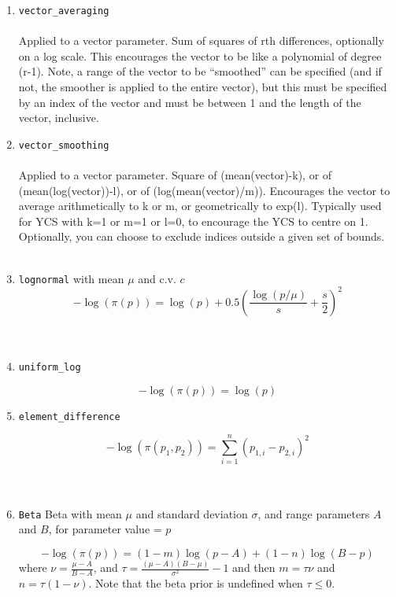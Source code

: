 \begin{enumerate}
	\item \texttt{vector\_averaging}
	\\\\
	Applied to a vector parameter. Sum of squares of rth differences, optionally on a log scale. This encourages the vector to be like a polynomial of degree (r-1). Note, a range of the vector to be “smoothed” can be specified (and if not, the smoother is applied to the entire vector), but this must be specified by an index of the vector and must be between 1 and the length of the vector, inclusive.
	\item \texttt{vector\_smoothing}
	\\\\
	Applied to a vector parameter. Square of (mean(vector)-k), or of (mean(log(vector))-l), or of (log(mean(vector)/m)). Encourages the vector to average arithmetically to k or m, or geometrically to exp(l). Typically used for YCS with k=1 or m=1 or l=0, to encourage the YCS to centre on 1. Optionally, you can choose to exclude indices outside a given set of bounds.
	\\\\
	\item\texttt{lognormal}
	 with mean $\mu$ and c.v. $c$
	\begin{equation}
	- \log \left(\pi \left(p \right) \right) = \log \left( p \right) + 0.5 \left( \frac{\log \left( p / \mu \right)}{s} + \frac{s}{2} \right)^2
	\end{equation}
	\\\\
	\item\texttt{uniform\_log}

	\begin{equation}
	- \log \left(\pi \left(p \right) \right) = \log \left( p \right)
	\end{equation}
	\item\texttt{element\_difference}

	\begin{equation}
	- \log \left(\pi \left(p_1,p_2 \right) \right) = \sum_{i = 1}^n \left( p_{1,i} - p_{2,i} \right)^2
	\end{equation}
	\\\\
	\item\texttt{Beta}
	{Beta with mean $\mu$ and standard deviation $\sigma$, and range parameters $A$ and $B$, for parameter value = $p$}

	\begin{equation}
	- \log \left(\pi \left( p \right) \right) = \left( 1 - m \right) \log \left( p - A \right) + \left( 1 - n \right)\log \left( B - p \right)
	\end{equation}
	where $\nu  = \frac{\mu  - A}{B - A}$, and $\tau = \frac{\left(\mu -A \right)\left(B - \mu \right)}{\sigma ^2} - 1$ and then $m=\tau \nu$ and $n=\tau(1-\nu)$. Note that the beta prior is undefined when $\tau \leq 0$.
\end{enumerate}

